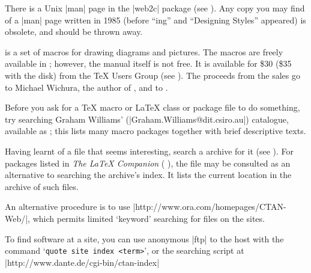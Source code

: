 There is a Unix \BibTeX{} \ProgName|man| page in the \ProgName|web2c|
package (see ).  Any copy
you may find of a \ProgName|man| page written in 1985 (before
``\BibTeX{}ing'' and ``Designing \BibTeX{} Styles'' appeared) is
obsolete, and should be thrown away.


\PiCTeX{} is a set of macros for drawing diagrams and pictures. The
macros are freely available in ; however, the
\PiCTeX{} manual itself is not free. It is available for \$30 (\$35
with the disk) from the \TeX{} Users Group (see
).
The proceeds from the sales go to Michael Wichura, the author of \PiCTeX{},
and to .


Before you ask for a \TeX{} macro or \LaTeX{} class or package file to do
something, try searching Graham Williams'
(\Email|Graham.Williams@dit.csiro.au|) catalogue, available as
; this lists many macro packages together with
brief descriptive texts.


Having learnt of a file
that seems interesting, search a  archive for it (see 
). For packages
listed in 
\htmlignore
\emph{The \LaTeX{} Companion} (%
\endhtmlignore
{}%
\htmlignore
),
\endhtmlignore
the file  may be consulted as an alternative to
searching the archive's index. It lists the current location in the archive of
such files.

An alternative procedure is to use
\URL|http://www.ora.com/homepages/CTAN-Web/|, which permits limited
`keyword' searching for files on the  sites.


To find software at a  site, you can use anonymous |ftp| to
the host with the command `\texttt{quote site index <term>}', or the
searching script at \URL|http://www.dante.de/cgi-bin/ctan-index|

